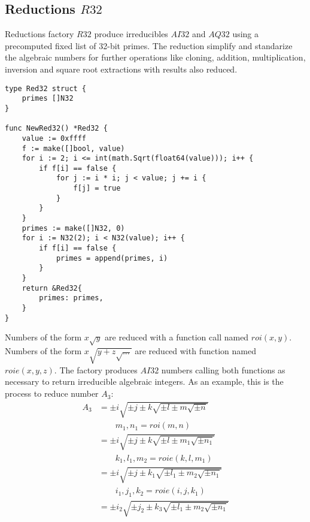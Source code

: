 \documentclass{article}
\begin{document}
\subsection{Reductions $R32$}
Reductions factory $R32$ produce irreducibles $AI32$ and $AQ32$ using a precomputed fixed list of 32-bit primes. The reduction simplify and standarize the algebraic numbers for further
operations like cloning, addition, multiplication, inversion and square root extractions with results also reduced.
\begin{lstlisting}
type Red32 struct {
	primes []N32
}

func NewRed32() *Red32 {
	value := 0xffff
    f := make([]bool, value)
    for i := 2; i <= int(math.Sqrt(float64(value))); i++ {
        if f[i] == false {
            for j := i * i; j < value; j += i {
                f[j] = true
            }
        }
    }
    primes := make([]N32, 0)
    for i := N32(2); i < N32(value); i++ {
        if f[i] == false {
            primes = append(primes, i)
        }
    }
	return &Red32{
		primes: primes,
	}
}
\end{lstlisting}
Numbers of the form $x\sqrt{y}$ are reduced with a function call named $roi(x,y)$.
Numbers of the form $x\sqrt{y + z\sqrt{...}}$ are reduced with function named $roie(x,y,z)$.
The factory produces $AI32$ numbers calling both functions as necessary to return
irreducible algebraic integers. As an example, this is the process to reduce number $A_3$:
\begin{align}
A_3 &= \pm i\sqrt{\pm j \pm k\sqrt{\pm l \pm m\sqrt{\pm n}}}\\
 &\qquad \boxed{ m_1, n_1 = roi(m, n) }\\
 &= \pm i\sqrt{\pm j \pm k\sqrt{\pm l \pm m_1\sqrt{\pm n_1}}}\\
 &\qquad \boxed{ k_1, l_1, m_2 = roie(k, l, m_1) }\\
 &= \pm i\sqrt{\pm j \pm k_1\sqrt{\pm l_1 \pm m_2\sqrt{\pm n_1}}}\\
 &\qquad \boxed{ i_1, j_1, k_2 = roie(i, j, k_1) }\\
 &= \pm i_2\sqrt{\pm j_2 \pm k_3\sqrt{\pm l_1 \pm m_2\sqrt{\pm n_1}}}
\end{align}
\end{document}

